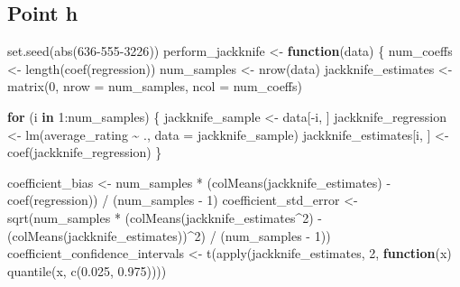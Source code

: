 \documentclass[
]{article}
\newenvironment{Shaded}{\begin{snugshade}}{\end{snugshade}}
\newcommand{\AttributeTok}[1]{\textcolor[rgb]{0.77,0.63,0.00}{#1}}
\newcommand{\ControlFlowTok}[1]{\textcolor[rgb]{0.13,0.29,0.53}{\textbf{#1}}}
\newcommand{\DecValTok}[1]{\textcolor[rgb]{0.00,0.00,0.81}{#1}}
\newcommand{\FloatTok}[1]{\textcolor[rgb]{0.00,0.00,0.81}{#1}}
\newcommand{\FunctionTok}[1]{\textcolor[rgb]{0.00,0.00,0.00}{#1}}
\newcommand{\NormalTok}[1]{#1}
\newcommand{\OtherTok}[1]{\textcolor[rgb]{0.56,0.35,0.01}{#1}}
\newcommand{\SpecialCharTok}[1]{\textcolor[rgb]{0.00,0.00,0.00}{#1}}
\begin{document}
\hypertarget{point-h}{%
\subsection{Point h}\label{point-h}}

\begin{Shaded}
\begin{Highlighting}[]
\FunctionTok{set.seed}\NormalTok{(}\FunctionTok{abs}\NormalTok{(}\DecValTok{636{-}555{-}3226}\NormalTok{))}
\NormalTok{perform\_jackknife }\OtherTok{\textless{}{-}} \ControlFlowTok{function}\NormalTok{(data) \{}
\NormalTok{  num\_coeffs }\OtherTok{\textless{}{-}} \FunctionTok{length}\NormalTok{(}\FunctionTok{coef}\NormalTok{(regression))}
\NormalTok{  num\_samples }\OtherTok{\textless{}{-}} \FunctionTok{nrow}\NormalTok{(data)}
\NormalTok{  jackknife\_estimates }\OtherTok{\textless{}{-}} \FunctionTok{matrix}\NormalTok{(}\DecValTok{0}\NormalTok{, }\AttributeTok{nrow =}\NormalTok{ num\_samples, }\AttributeTok{ncol =}\NormalTok{ num\_coeffs)}
  
  \ControlFlowTok{for}\NormalTok{ (i }\ControlFlowTok{in} \DecValTok{1}\SpecialCharTok{:}\NormalTok{num\_samples) \{}
\NormalTok{    jackknife\_sample }\OtherTok{\textless{}{-}}\NormalTok{ data[}\SpecialCharTok{{-}}\NormalTok{i, ] }
\NormalTok{    jackknife\_regression }\OtherTok{\textless{}{-}} \FunctionTok{lm}\NormalTok{(average\_rating }\SpecialCharTok{\textasciitilde{}}\NormalTok{ ., }\AttributeTok{data =}\NormalTok{ jackknife\_sample)}
\NormalTok{    jackknife\_estimates[i, ] }\OtherTok{\textless{}{-}} \FunctionTok{coef}\NormalTok{(jackknife\_regression)}
\NormalTok{  \}}
  
\NormalTok{  coefficient\_bias }\OtherTok{\textless{}{-}}\NormalTok{ num\_samples }\SpecialCharTok{*}\NormalTok{ (}\FunctionTok{colMeans}\NormalTok{(jackknife\_estimates) }\SpecialCharTok{{-}} \FunctionTok{coef}\NormalTok{(regression)) }\SpecialCharTok{/}\NormalTok{ (num\_samples }\SpecialCharTok{{-}} \DecValTok{1}\NormalTok{)}
\NormalTok{  coefficient\_std\_error }\OtherTok{\textless{}{-}} \FunctionTok{sqrt}\NormalTok{(num\_samples }\SpecialCharTok{*}\NormalTok{ (}\FunctionTok{colMeans}\NormalTok{(jackknife\_estimates}\SpecialCharTok{\^{}}\DecValTok{2}\NormalTok{) }\SpecialCharTok{{-}}\NormalTok{ (}\FunctionTok{colMeans}\NormalTok{(jackknife\_estimates))}\SpecialCharTok{\^{}}\DecValTok{2}\NormalTok{) }\SpecialCharTok{/}\NormalTok{ (num\_samples }\SpecialCharTok{{-}} \DecValTok{1}\NormalTok{))}
\NormalTok{  coefficient\_confidence\_intervals }\OtherTok{\textless{}{-}} \FunctionTok{t}\NormalTok{(}\FunctionTok{apply}\NormalTok{(jackknife\_estimates, }\DecValTok{2}\NormalTok{, }\ControlFlowTok{function}\NormalTok{(x) }\FunctionTok{quantile}\NormalTok{(x, }\FunctionTok{c}\NormalTok{(}\FloatTok{0.025}\NormalTok{, }\FloatTok{0.975}\NormalTok{))))}
  

\end{Highlighting}
\end{Shaded}
\end{document}
